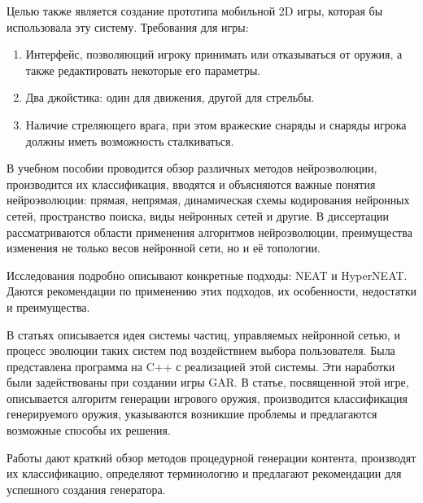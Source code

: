 \vspace{5mm}

Целью также является создание прототипа мобильной 2D игры, которая бы использовала эту систему. Требования для игры:
\begin{enumerate}
    \item Интерфейс, позволяющий игроку принимать или отказываться от оружия, а также редактировать некоторые его параметры.
    \item Два джойстика: один для движения, другой для стрельбы.
    \item Наличие стреляющего врага, при этом вражеские снаряды и снаряды игрока должны иметь возможность сталкиваться.
\end{enumerate}

\pagebreak


В учебном пособии\cite{s4} проводится обзор различных методов нейроэволюции, производится их классификация, вводятся и объясняются важные понятия нейроэволюции: прямая, непрямая, динамическая схемы кодирования нейронных сетей, пространство поиска, виды нейронных сетей и другие. В диссертации\cite{s5} рассматриваются области применения алгоритмов нейроэволюции, преимущества изменения не только весов нейронной сети, но и её топологии.

Исследования\cite{s1,s16} подробно описывают конкретные подходы: NEAT и HyperNEAT. Даются рекомендации по применению этих подходов, их особенности, недостатки и преимущества.

В статьях\cite{s2,s3} описывается идея системы частиц, управляемых нейронной сетью, и процесс эволюции таких систем под воздействием выбора пользователя. Была представлена программа на C++ с реализацией этой системы\cite{s12}. Эти наработки были задействованы при создании игры GAR. В статье\cite{s15}, посвященной этой игре, описывается алгоритм генерации игрового оружия, производится классификация генерируемого оружия, указываются возникшие проблемы и предлагаются возможные способы их решения.

Работы\cite{s6,s11} дают краткий обзор методов процедурной генерации контента, производят их классификацию, определяют терминологию и предлагают рекомендации для успешного создания генератора.


